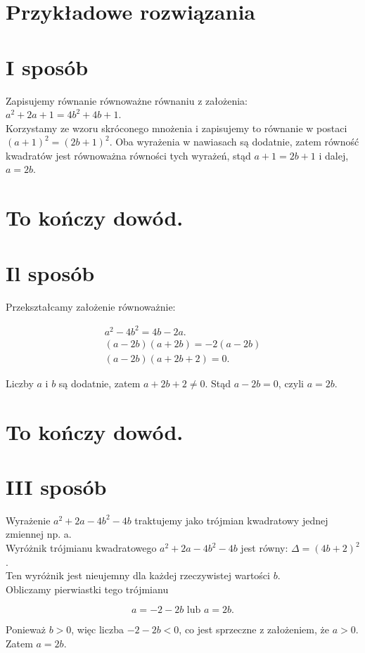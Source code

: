 \documentclass[10pt]{article}
\begin{document}
\section*{Przykładowe rozwiązania}
\section*{I sposób}
Zapisujemy równanie równoważne równaniu z założenia: $a^{2}+2 a+1=4 b^{2}+4 b+1$.\\
Korzystamy ze wzoru skróconego mnożenia i zapisujemy to równanie w postaci $(a+1)^{2}=(2 b+1)^{2}$. Oba wyrażenia w nawiasach są dodatnie, zatem równość kwadratów jest równoważna równości tych wyrażeń, stąd $a+1=2 b+1$ i dalej, $a=2 b$.

\section*{To kończy dowód.}
\section*{Il sposób}
Przekształcamy założenie równoważnie:

$$
\begin{gathered}
a^{2}-4 b^{2}=4 b-2 a . \\
(a-2 b)(a+2 b)=-2(a-2 b) \\
(a-2 b)(a+2 b+2)=0 .
\end{gathered}
$$

Liczby $a$ i $b$ są dodatnie, zatem $a+2 b+2 \neq 0$. Stąd $a-2 b=0$, czyli $a=2 b$.

\section*{To kończy dowód.}
\section*{III sposób}
Wyrażenie $a^{2}+2 a-4 b^{2}-4 b$ traktujemy jako trójmian kwadratowy jednej zmiennej np. a.\\
Wyróżnik trójmianu kwadratowego $a^{2}+2 a-4 b^{2}-4 b$ jest równy: $\Delta=(4 b+2)^{2}$.\\
Ten wyróżnik jest nieujemny dla każdej rzeczywistej wartości $b$.\\
Obliczamy pierwiastki tego trójmianu

$$
a=-2-2 b \text { lub } a=2 b .
$$

Ponieważ $b>0$, więc liczba $-2-2 b<0$, co jest sprzeczne z założeniem, że $a>0$.\\
Zatem $a=2 b$.
\end{document}
